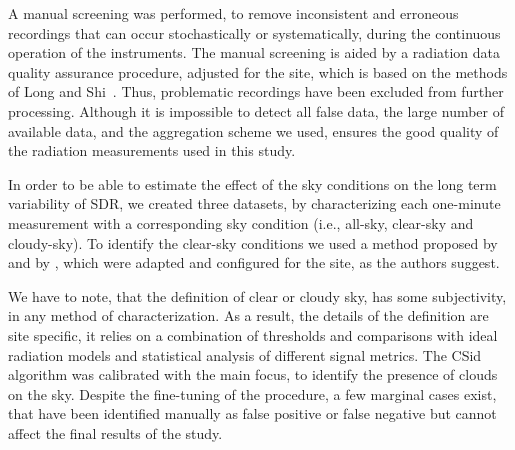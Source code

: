 \documentclass[applsci,article,submit,moreauthors,pdftex]{Definitions/mdpi}
\begin{document}
A manual screening was performed, to remove inconsistent and erroneous
recordings that can occur stochastically or systematically, during the
continuous operation of the instruments. The manual screening is aided
by a radiation data quality assurance procedure, adjusted for the site,
which is based on the methods of Long and
Shi~\citetext{\citeyear{Long2008a}; \citeyear{Long2006}}. Thus,
problematic recordings have been excluded from further processing.
Although it is impossible to detect all false data, the large number of
available data, and the aggregation scheme we used, ensures the good
quality of the radiation measurements used in this study.

In order to be able to estimate the effect of the sky conditions on the
long term variability of SDR, we created three datasets, by
characterizing each one-minute measurement with a corresponding sky
condition (i.e., all-sky, clear-sky and cloudy-sky). To identify the
clear-sky conditions we used a method proposed by \citet{Long2000} and
by \citet{Reno2016}, which were adapted and configured for the site, as
the authors suggest.

We have to note, that the definition of clear or cloudy sky, has some
subjectivity, in any method of characterization. As a result, the
details of the definition are site specific, it relies on a combination
of thresholds and comparisons with ideal radiation models and
statistical analysis of different signal metrics. The CSid algorithm was
calibrated with the main focus, to identify the presence of clouds on
the sky. Despite the fine-tuning of the procedure, a few marginal cases
exist, that have been identified manually as false positive or false
negative but cannot affect the final results of the study.
\end{document}
